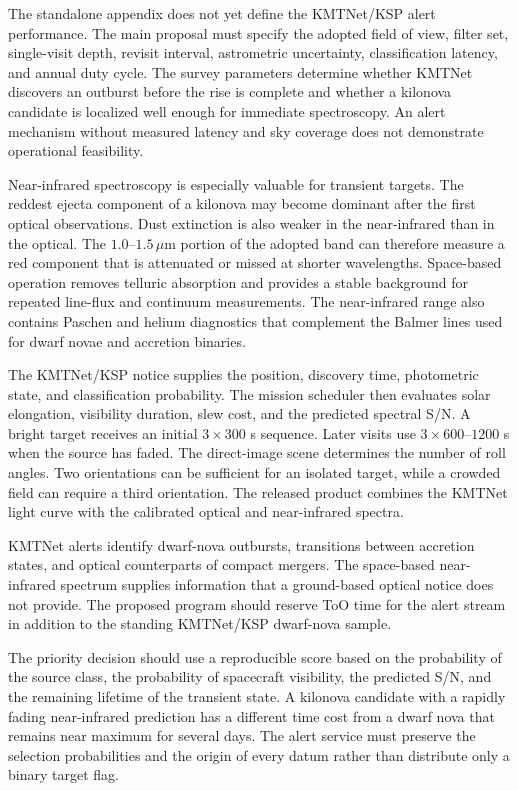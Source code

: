 \documentclass[10pt,onecolumn]{article}
\newcommand{\micron}{\,\mu\mathrm{m}}
\begin{document}
The standalone appendix does not yet define the KMTNet/KSP alert performance.
The main proposal must specify the adopted field of view, filter set,
single-visit depth, revisit interval, astrometric uncertainty, classification
latency, and annual duty cycle. The survey parameters determine whether KMTNet
discovers an outburst before the rise is complete and whether a kilonova
candidate is localized well enough for immediate spectroscopy. An alert
mechanism without measured latency and sky coverage does not demonstrate
operational feasibility.

Near-infrared spectroscopy is especially valuable for transient targets. The
reddest ejecta component of a kilonova may become dominant after the first
optical observations. Dust extinction is also weaker in the near-infrared than
in the optical. The $1.0$--$1.5\micron$ portion of the adopted band can
therefore measure a red component that is attenuated or missed at shorter
wavelengths.
Space-based operation removes telluric absorption and provides a stable
background for repeated line-flux and continuum measurements. The
near-infrared range also contains Paschen and helium diagnostics that
complement the Balmer lines used for dwarf novae and accretion binaries.

The KMTNet/KSP notice supplies the position, discovery time, photometric
state, and classification probability. The mission scheduler then evaluates
solar elongation, visibility duration, slew cost, and the predicted spectral S/N.
A bright target receives an initial $3\times300$ s sequence. Later visits use
$3\times600$--$1200$ s when the source has faded. The direct-image scene
determines the number of roll angles. Two orientations can be sufficient for
an isolated target, while a crowded field can require a third orientation.
The released product combines the KMTNet light curve with the calibrated
optical and near-infrared spectra.

KMTNet alerts identify dwarf-nova outbursts, transitions between accretion
states, and optical counterparts of compact mergers. The space-based near-infrared
spectrum supplies information that a ground-based optical notice does not
provide. The proposed program should reserve ToO time for the alert stream in
addition to the standing KMTNet/KSP dwarf-nova sample.

The priority decision should use a reproducible score based on the probability
of the source class, the probability of spacecraft visibility, the predicted
S/N, and the remaining lifetime of the transient state. A kilonova candidate
with a rapidly fading near-infrared prediction has a different time cost from
a dwarf nova that remains near maximum for several days. The alert service
must preserve the selection probabilities and the origin of every datum rather
than distribute only a binary target flag.
\end{document}
